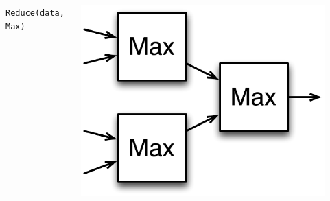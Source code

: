 \documentclass[xcolor=pdflatex,dvipsnames,table]{beamer}
\begin{document}
\begin{frame}
\begin{Large}
\begin{columns}
\verb+Reduce(data, Max)+ \\
\begin{center}
\includegraphics[width=0.9\textwidth]{figs/reduce.pdf} \\
\end{center}


\end{columns}

\end{Large}

\end{frame}
\end{document}
